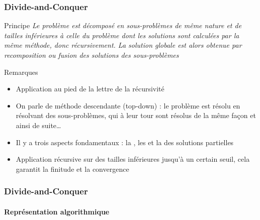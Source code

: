 \documentclass[aspectratio=1610,francais,envcountsect]{beamer}
\begin{document}
\begin{frame}
  \frametitle{Divide-and-Conquer}
  \begin{alertblock}{Principe}
    \it Le problème est \alert{décomposé} en sous-problèmes de même
    nature et de tailles inférieures à celle du problème dont les
    solutions sont calculées par la même méthode, donc
    récursivement. La solution globale est alors obtenue par
    recomposition ou \alert{fusion} des solutions des sous-problèmes
  \end{alertblock}

  \begin{exampleblock}{Remarques}
    \begin{itemize}
    \item Application au pied de la lettre de la récursivité
    \item On parle de méthode descendante (top-down) : le problème est
      résolu en résolvant des sous-problèmes, qui à leur tour sont
      résolus de la même façon et ainsi de suite\ldots
    \item Il y a trois aspects fondamentaux : la
      , les  et
      la  des solutions partielles
    \item Application récursive sur des tailles inférieures jusqu’à un
      certain seuil, cela garantit la finitude et la convergence
    \end{itemize}
  \end{exampleblock}
\end{frame}

\begin{frame}[fragile]
  \frametitle{Divide-and-Conquer} \framesubtitle{Représentation
    algorithmique}

  \begin{algorithm}[H]
    \DontPrintSemicolon {}
     
     
  \end{algorithm}
\end{frame}
\end{document}
